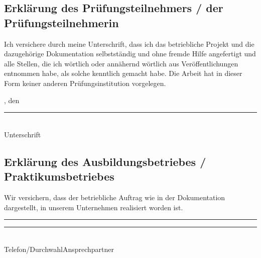 \clearpage
{}

\subsection{Erklärung des Prüfungsteilnehmers / der Prüfungsteilnehmerin}

Ich versichere durch meine Unterschrift, dass ich das betriebliche Projekt und
die dazugehörige Dokumentation selbstständig und ohne fremde Hilfe angefertigt
und alle Stellen, die ich wörtlich oder annähernd wörtlich aus Veröffentlichungen
entnommen habe, als solche kenntlich gemacht habe. Die Arbeit hat in dieser
Form keiner anderen Prüfungsinstitution vorgelegen.

\abgabeOrt, den \abgabeTermin


\rule[-0.2cm]{5.5cm}{0.5pt}\\
Unterschrift

\subsection{Erklärung des Ausbildungsbetriebes / Praktikumsbetriebes}

Wir versichern, dass der betriebliche Auftrag wie in der Dokumentation dargestellt,
in unserem Unternehmen realisiert worden ist.

\rule[-0.2cm]{5.5cm}{0.5pt}
\hspace{1cm}
\rule[-0.2cm]{5.5cm}{0.5pt}\\
Telefon/Durchwahl\hspace{3.3cm}Ansprechpartner